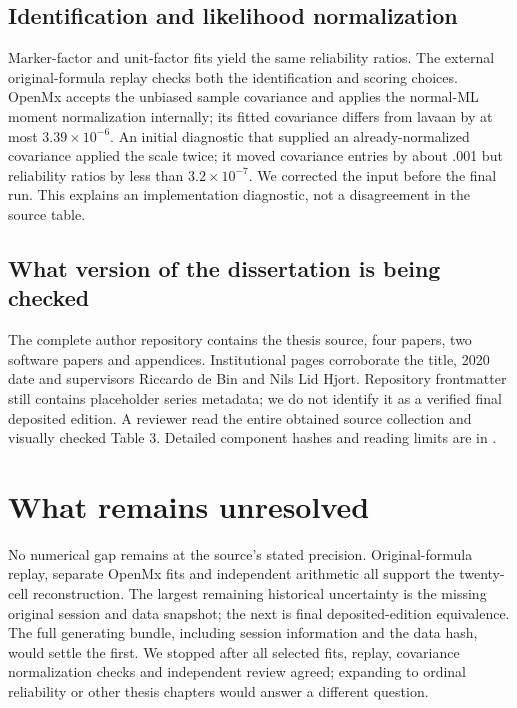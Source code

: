 \subsection{Identification and likelihood normalization}
Marker-factor and unit-factor fits yield the same reliability ratios. The external original-formula replay checks both the identification and scoring choices. OpenMx accepts the unbiased sample covariance and applies the normal-ML moment normalization internally; its fitted covariance differs from lavaan by at most $3.39\times10^{-6}$. An initial diagnostic that supplied an already-normalized covariance applied the scale twice; it moved covariance entries by about .001 but reliability ratios by less than $3.2\times10^{-7}$. We corrected the input before the final run. This explains an implementation diagnostic, not a disagreement in the source table.
\subsection{What version of the dissertation is being checked}
The complete author repository contains the thesis source, four papers, two software papers and appendices. Institutional pages corroborate the title, 2020 date and supervisors Riccardo de Bin and Nils Lid Hjort. Repository frontmatter still contains placeholder series metadata; we do not identify it as a verified final deposited edition. A reviewer read the entire obtained source collection and visually checked Table 3. Detailed component hashes and reading limits are in .

\section{What remains unresolved}
No numerical gap remains at the source's stated precision. Original-formula replay, separate OpenMx fits and independent arithmetic all support the twenty-cell reconstruction. The largest remaining historical uncertainty is the missing original session and data snapshot; the next is final deposited-edition equivalence. The full generating bundle, including session information and the data hash, would settle the first. We stopped after all selected fits, replay, covariance normalization checks and independent review agreed; expanding to ordinal reliability or other thesis chapters would answer a different question.

